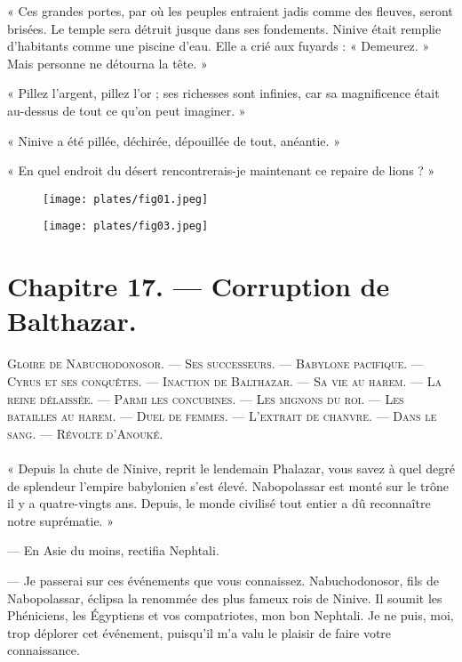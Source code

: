 \documentclass[a4paper, 11pt, oneside, polutonikogreek, french]{article}
\begin{document}
« Ces grandes portes, par où les peuples entraient jadis comme des fleuves, seront brisées. Le temple sera détruit jusque dans ses fondements. Ninive était remplie d'habitants comme une piscine d'eau. Elle a crié aux fuyards : « Demeurez. » Mais personne ne détourna la tête. »

« Pillez l'argent, pillez l'or ; ses richesses sont infinies, car sa magnificence était au-dessus de tout ce qu'on peut imaginer. »

« Ninive a été pillée, déchirée, dépouillée de tout, anéantie. »

« En quel endroit du désert rencontrerais-je maintenant ce repaire de lions ? »

\begin{figure}[H]
\centering
\texttt{[image: plates/fig01.jpeg]}
\end{figure}
\clearpage
\begin{figure}[H]
\centering
\texttt{[image: plates/fig03.jpeg]}
\end{figure}
\section{Chapitre 17. --- Corruption de Balthazar.}
\begin{center}
\scshape
\small
Gloire de Nabuchodonosor. --- Ses successeurs. --- Babylone pacifique. --- Cyrus et ses conquêtes. --- Inaction de Balthazar. --- Sa vie au harem. --- La reine délaissée. --- Parmi les concubines. --- Les mignons du roi. --- Les batailles au harem. --- Duel de femmes. --- L'extrait de chanvre. --- Dans le sang. --- Révolte d'Anouké.
\end{center}
\paragraph{}
« Depuis la chute de Ninive, reprit le lendemain Phalazar, vous savez à quel degré de splendeur l'empire babylonien s'est élevé. Nabopolassar est monté sur le trône il y a quatre-vingts ans. Depuis, le monde civilisé tout entier a dû reconnaître notre suprématie. »

--- En Asie du moins, rectifia Nephtali.

--- Je passerai sur ces événements que vous connaissez. Nabuchodonosor, fils de Nabopolassar, éclipsa la renommée des plus fameux rois de Ninive. Il soumit les Phéniciens, les Égyptiens et vos compatriotes, mon bon Nephtali. Je ne puis, moi, trop déplorer cet événement, puisqu'il m'a valu le plaisir de faire votre connaissance.
\end{document}
